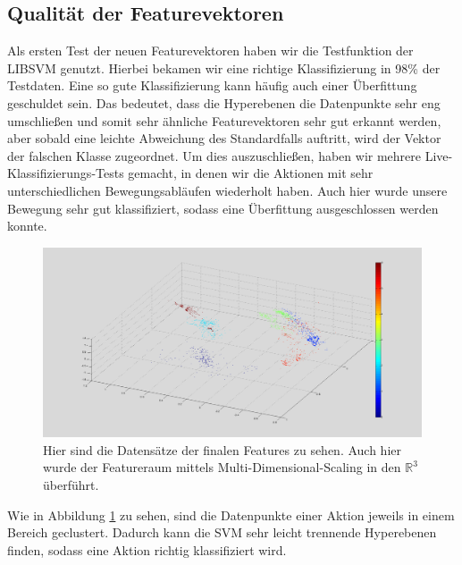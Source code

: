 \subsection{Qualität der Featurevektoren}
\label{subsec:qualitaet-der-feature-vektoren}
Als ersten Test der neuen Featurevektoren haben wir die Testfunktion der LIBSVM genutzt. Hierbei bekamen wir eine richtige Klassifizierung in 98\% der Testdaten. Eine so gute Klassifizierung kann häufig auch einer \glqq{}Überfittung\grqq{} geschuldet sein. Das bedeutet, dass die Hyperebenen die Datenpunkte sehr eng umschließen und somit sehr ähnliche Featurevektoren sehr gut erkannt werden, aber sobald eine leichte Abweichung des Standardfalls auftritt, wird der Vektor der falschen Klasse zugeordnet. Um dies auszuschließen, haben wir mehrere Live-Klassifizierungs-Tests gemacht, in denen wir die Aktionen mit sehr unterschiedlichen Bewegungsabläufen wiederholt haben. Auch hier wurde unsere Bewegung sehr gut klassifiziert, sodass eine Überfittung ausgeschlossen werden konnte.
\begin{figure}[hbtp]
\includegraphics[width=1.0\linewidth]{NewFeatures.png}
\caption{Hier sind die Datensätze der finalen Features zu sehen. Auch hier wurde der Featureraum mittels Multi-Dimensional-Scaling in den $\mathbb{R}^3$ überführt.}
\label{fig:New-Features}
\end{figure}
Wie in Abbildung \ref{fig:New-Features} zu sehen, sind die Datenpunkte einer Aktion jeweils in einem Bereich geclustert. Dadurch kann die SVM sehr leicht trennende Hyperebenen finden, sodass eine Aktion richtig klassifiziert wird.

